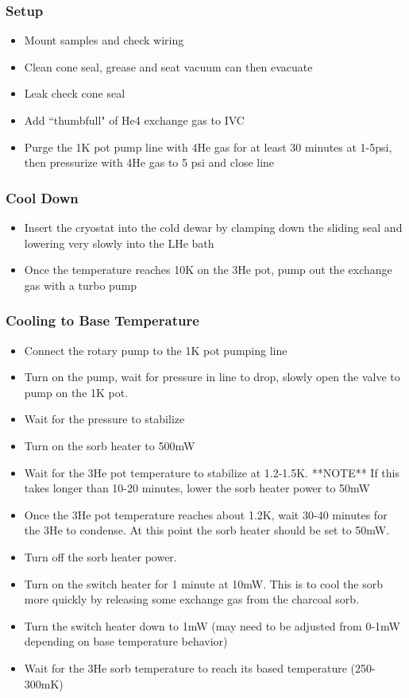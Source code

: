 \subsubsection*{Setup}

\begin{itemize}
\item Mount samples and check wiring
\item Clean cone seal, grease and seat vacuum can then evacuate
\item Leak check cone seal
\item Add ``thumbfull" of He4 exchange gas to IVC
\item Purge the 1K pot pump line with 4He gas for at least 30 minutes at 1-5psi, then pressurize with 4He gas to 5 psi and close line
\end{itemize}

\subsubsection*{Cool Down}

\begin{itemize}
\item Insert the cryostat into the cold dewar by clamping down the sliding seal and lowering very slowly into the LHe bath
\item Once the temperature reaches 10K on the 3He pot, pump out the exchange gas with a turbo pump
\end{itemize}

\subsubsection*{Cooling to Base Temperature}

\begin{itemize}
\item Connect the rotary pump to the 1K pot pumping line
\item Turn on the pump, wait for pressure in line to drop, slowly open the valve to pump on the 1K pot.
\item Wait for the pressure to stabilize 
\item Turn on the sorb heater to 500mW
\item Wait for the 3He pot temperature to stabilize at 1.2-1.5K. 
**NOTE** If this takes longer than 10-20 minutes, lower the sorb heater power to 50mW
\item Once the 3He pot temperature reaches about 1.2K, wait 30-40 minutes for the 3He to condense. At this point the sorb heater should be set to 50mW.
\item Turn off the sorb heater power.
\item Turn on the switch heater for 1 minute at 10mW. This is to cool the sorb more quickly by releasing some exchange gas from the charcoal sorb.
\item Turn the switch heater down to 1mW (may need to be adjusted from 0-1mW depending on base temperature behavior)
\item Wait for the 3He sorb temperature to reach its based temperature (250-300mK)
\end{itemize}

